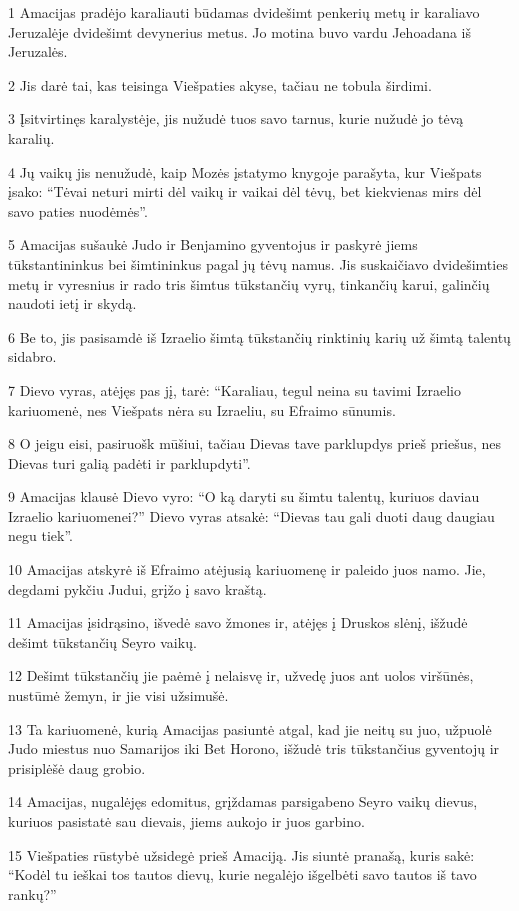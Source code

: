 \par 1 Amacijas pradėjo karaliauti būdamas dvidešimt penkerių metų ir karaliavo Jeruzalėje dvidešimt devynerius metus. Jo motina buvo vardu Jehoadana iš Jeruzalės. 
\par 2 Jis darė tai, kas teisinga Viešpaties akyse, tačiau ne tobula širdimi. 
\par 3 Įsitvirtinęs karalystėje, jis nužudė tuos savo tarnus, kurie nužudė jo tėvą karalių. 
\par 4 Jų vaikų jis nenužudė, kaip Mozės įstatymo knygoje parašyta, kur Viešpats įsako: “Tėvai neturi mirti dėl vaikų ir vaikai dėl tėvų, bet kiekvienas mirs dėl savo paties nuodėmės”. 
\par 5 Amacijas sušaukė Judo ir Benjamino gyventojus ir paskyrė jiems tūkstantininkus bei šimtininkus pagal jų tėvų namus. Jis suskaičiavo dvidešimties metų ir vyresnius ir rado tris šimtus tūkstančių vyrų, tinkančių karui, galinčių naudoti ietį ir skydą. 
\par 6 Be to, jis pasisamdė iš Izraelio šimtą tūkstančių rinktinių karių už šimtą talentų sidabro. 
\par 7 Dievo vyras, atėjęs pas jį, tarė: “Karaliau, tegul neina su tavimi Izraelio kariuomenė, nes Viešpats nėra su Izraeliu, su Efraimo sūnumis. 
\par 8 O jeigu eisi, pasiruošk mūšiui, tačiau Dievas tave parklupdys prieš priešus, nes Dievas turi galią padėti ir parklupdyti”. 
\par 9 Amacijas klausė Dievo vyro: “O ką daryti su šimtu talentų, kuriuos daviau Izraelio kariuomenei?” Dievo vyras atsakė: “Dievas tau gali duoti daug daugiau negu tiek”. 
\par 10 Amacijas atskyrė iš Efraimo atėjusią kariuomenę ir paleido juos namo. Jie, degdami pykčiu Judui, grįžo į savo kraštą. 
\par 11 Amacijas įsidrąsino, išvedė savo žmones ir, atėjęs į Druskos slėnį, išžudė dešimt tūkstančių Seyro vaikų. 
\par 12 Dešimt tūkstančių jie paėmė į nelaisvę ir, užvedę juos ant uolos viršūnės, nustūmė žemyn, ir jie visi užsimušė. 
\par 13 Ta kariuomenė, kurią Amacijas pasiuntė atgal, kad jie neitų su juo, užpuolė Judo miestus nuo Samarijos iki Bet Horono, išžudė tris tūkstančius gyventojų ir prisiplėšė daug grobio. 
\par 14 Amacijas, nugalėjęs edomitus, grįždamas parsigabeno Seyro vaikų dievus, kuriuos pasistatė sau dievais, jiems aukojo ir juos garbino. 
\par 15 Viešpaties rūstybė užsidegė prieš Amaciją. Jis siuntė pranašą, kuris sakė: “Kodėl tu ieškai tos tautos dievų, kurie negalėjo išgelbėti savo tautos iš tavo rankų?” 
